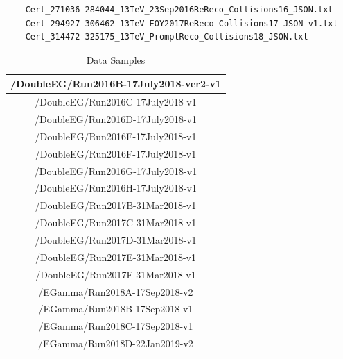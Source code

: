 \begin{verbatim}
	Cert_271036 284044_13TeV_23Sep2016ReReco_Collisions16_JSON.txt
	Cert_294927 306462_13TeV_EOY2017ReReco_Collisions17_JSON_v1.txt 
	Cert_314472 325175_13TeV_PromptReco_Collisions18_JSON.txt 
\end{verbatim} 

\begin{table}[h!]
	\centering
	\caption{Data Samples}
	\begin{tabular}{|c|}
		\hline
		/DoubleEG/Run2016B-17July2018-ver2-v1 \\
		\hline
		/DoubleEG/Run2016C-17July2018-v1 \\
		\hline
		/DoubleEG/Run2016D-17July2018-v1 \\
		\hline
		/DoubleEG/Run2016E-17July2018-v1 \\
		\hline
		/DoubleEG/Run2016F-17July2018-v1 \\
		\hline
		/DoubleEG/Run2016G-17July2018-v1 \\
		\hline
		/DoubleEG/Run2016H-17July2018-v1 \\
		\hline
		/DoubleEG/Run2017B-31Mar2018-v1 \\
		\hline
		/DoubleEG/Run2017C-31Mar2018-v1 \\
		\hline
		/DoubleEG/Run2017D-31Mar2018-v1 \\
		\hline
		/DoubleEG/Run2017E-31Mar2018-v1 \\
		\hline
		/DoubleEG/Run2017F-31Mar2018-v1 \\
		\hline
		/EGamma/Run2018A-17Sep2018-v2 \\
		\hline
		/EGamma/Run2018B-17Sep2018-v1 \\
		\hline
		/EGamma/Run2018C-17Sep2018-v1 \\
		\hline
		/EGamma/Run2018D-22Jan2019-v2 \\
		\hline
	\end{tabular}
	\label{table:DataSamples}
\end{table}




